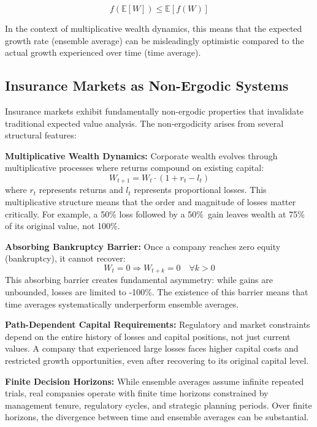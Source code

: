 \documentclass[11pt,letterpaper]{article}
\newcommand{\E}{\mathbb{E}}
\begin{document}
\begin{equation}
f(\E[W]) \leq \E[f(W)]
\end{equation}

In the context of multiplicative wealth dynamics, this means that the expected growth rate (ensemble average) can be misleadingly optimistic compared to the actual growth experienced over time (time average).

\subsection{Insurance Markets as Non-Ergodic Systems}

Insurance markets exhibit fundamentally non-ergodic properties that invalidate traditional expected value analysis. The non-ergodicity arises from several structural features:

\textbf{Multiplicative Wealth Dynamics:} Corporate wealth evolves through multiplicative processes where returns compound on existing capital:
\begin{equation}
W_{t+1} = W_t \cdot (1 + r_t - l_t)
\end{equation}
where $r_t$ represents returns and $l_t$ represents proportional losses. This multiplicative structure means that the order and magnitude of losses matter critically. For example, a 50\% loss followed by a 50\%~gain leaves wealth at 75\% of its original value, not 100\%.

\textbf{Absorbing Bankruptcy Barrier:} Once a company reaches zero equity (bankruptcy), it cannot recover:
\begin{equation}
W_t = 0 \Rightarrow W_{t+k} = 0 \quad \forall k > 0
\end{equation}
This absorbing barrier creates fundamental asymmetry: while gains are unbounded, losses are limited to -100\%. The existence of this barrier means that time averages systematically underperform ensemble averages.

\textbf{Path-Dependent Capital Requirements:} Regulatory and market constraints depend on the entire history of losses and capital positions, not just current values. A company that experienced large losses faces higher capital costs and restricted growth opportunities, even after recovering to its original capital level.

\textbf{Finite Decision Horizons:} While ensemble averages assume infinite repeated trials, real companies operate with finite time horizons constrained by management tenure, regulatory cycles, and strategic planning periods. Over finite horizons, the divergence between time and ensemble averages can be substantial.
\end{document}
